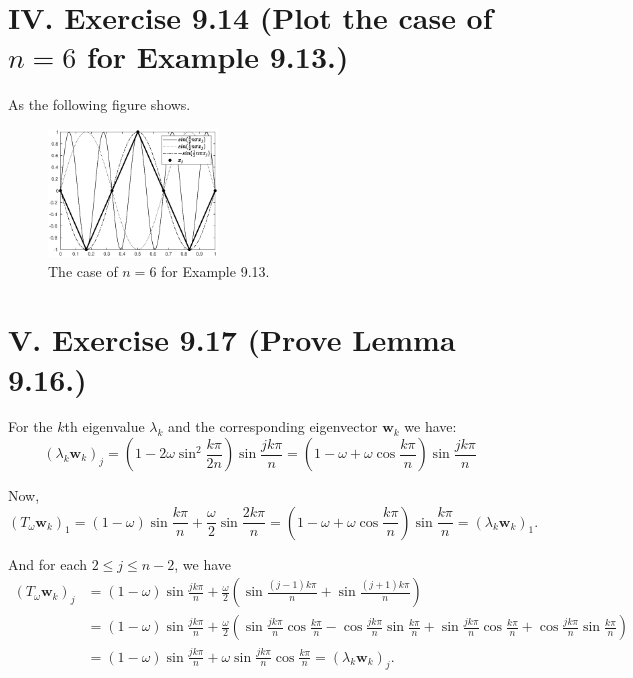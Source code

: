 \documentclass[twoside,a4paper]{article}
\begin{document}
\section*{IV. Exercise 9.14 (Plot the case of $n=6$ for Example 9.13.)}

\;\;\;\;\;\;As the following figure shows.
\begin{figure}[H]
    \centering
    \includegraphics[width=0.4\textwidth]{figure/ex9_14.eps}
    \caption{The case of $n=6$ for Example 9.13.}
\end{figure}

\section*{V. Exercise 9.17 (Prove Lemma 9.16.)}
\;\;\;\;\;\;For the $k$th eigenvalue $\lambda_k$ and the corresponding eigenvector $\mathbf{w}_k$ we have:
\begin{equation*}
    (\lambda_k\mathbf{w}_k)_j = \left(1-2\omega\sin^2\frac{k\pi}{2n}\right)\sin\frac{jk\pi}{n}=\left(1-\omega+\omega\cos\frac{k\pi}{n}\right)\sin\frac{jk\pi}{n}
\end{equation*}

Now,
\begin{equation*}
    (T_\omega\mathbf{w}_k)_1=(1-\omega)\sin\frac{k\pi}{n}+\frac{\omega}{2}\sin\frac{2k\pi}{n}=\left(1-\omega+\omega\cos\frac{k\pi}{n}\right)\sin\frac{k\pi}{n}=(\lambda_k\mathbf{w}_k)_1.
\end{equation*}

And for each $2\leq j\leq n-2$, we have
\begin{align*}
    (T_\omega\mathbf{w}_k)_j &= (1-\omega)\sin\frac{jk\pi}{n}+\frac{\omega}{2}\left(\sin\frac{(j-1)k\pi}{n}+\sin\frac{(j+1)k\pi}{n}\right)\\
    &= (1-\omega)\sin\frac{jk\pi}{n}+\frac{\omega}{2}\left(\sin\frac{jk\pi}{n}\cos\frac{k\pi}{n}-\cos\frac{jk\pi}{n}\sin\frac{k\pi}{n}+\sin\frac{jk\pi}{n}\cos\frac{k\pi}{n}+\cos\frac{jk\pi}{n}\sin\frac{k\pi}{n}\right)\\
    &= (1-\omega)\sin\frac{jk\pi}{n}+\omega\sin\frac{jk\pi}{n}\cos\frac{k\pi}{n}=(\lambda_k\mathbf{w}_k)_j.
\end{align*}
\end{document}
